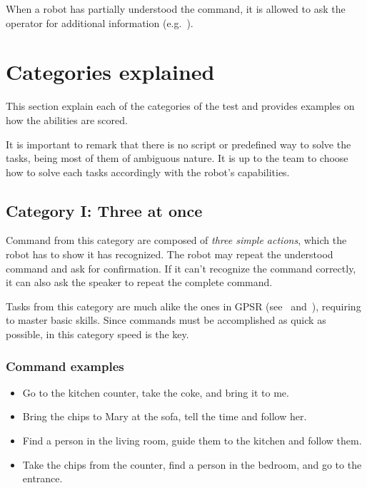 When a robot has partially understood the command, it is allowed to ask the operator for additional information (e.g.~\textit{}).

%
%
\section{Categories explained}
\label{sec:eegpsr-categories-explained}
This section explain each of the categories of the test and provides examples on how the abilities are scored.

It is important to remark that there is no script or predefined way to solve the tasks, being most of them of ambiguous nature. It is up to the team to choose how to solve each tasks accordingly with the robot's capabilities.



%
%
\subsection{Category I: Three at once}
\label{sec:eegpsr-category1-explained}
Command from this category are composed of \textit{three simple actions}, which the robot has to show it has recognized. The robot may repeat the understood command and ask for confirmation. If it can't recognize the command correctly, it can also ask the speaker to repeat the complete command.

Tasks from this category are much alike the ones in GPSR (see~ and~), requiring to master basic skills. Since commands must be accomplished as quick as possible, in this category speed is the key.

\subsubsection{Command examples}
\begin{itemize}
	\item Go to the kitchen counter, take the coke, and bring it to me.
	\item Bring the chips to Mary at the sofa, tell the time and follow her.
	\item Find a person in the living room, guide them to the kitchen and follow them.
	\item Take the chips from the counter, find a person in the bedroom, and go to the entrance.
\end{itemize}


